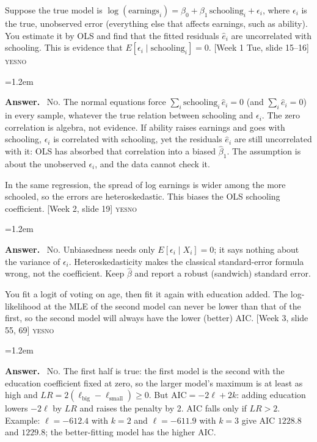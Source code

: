 \documentclass[11pt]{article}
\newcommand{\E}{E}
\newenvironment{answer}{\par\smallskip
  \begin{list}{}{\leftmargin=1.2em\rightmargin=0pt}\item[]\color{dukeblue}%
  \textbf{Answer.}\ }{\end{list}\smallskip}
\newcommand{\yn}{\nolinebreak\hspace*{1em plus 1fill}\mbox{\textsc{yes}\quad\textsc{no}}}
\newcommand{\slideref}[2]{{\footnotesize\color{gray}[Week #1, slide #2]}}
\begin{document}
\begin{enumerate}[leftmargin=*,itemsep=6pt]
\item Suppose the true model is $\log(\text{earnings}_i) = \beta_0 + \beta_1\,
      \text{schooling}_i + \epsilon_i$, where $\epsilon_i$ is the true, unobserved error
      (everything else that affects earnings, such as ability). You estimate it by OLS and
      find that the fitted residuals $\hat e_i$ are uncorrelated with schooling. This is
      evidence that $\E[\epsilon_i \mid \text{schooling}_i] = 0$.
      \slideref{1 Tue}{15--16} \yn
\begin{answer}
\textsc{No}. The normal equations force $\sum_i \text{schooling}_i\,\hat e_i = 0$ (and
$\sum_i \hat e_i = 0$) in every sample, whatever the true relation between schooling and
$\epsilon_i$. The zero correlation is algebra, not evidence. If ability raises earnings and
goes with schooling, $\epsilon_i$ is correlated with schooling, yet the residuals $\hat e_i$
are still uncorrelated with it: OLS has absorbed that correlation into a biased $\hat\beta_1$.
The assumption is about the unobserved $\epsilon_i$, and the data cannot check it.
\end{answer}

\item In the same regression, the spread of log earnings is wider among the more schooled,
      so the errors are heteroskedastic. This biases the OLS schooling coefficient.
      \slideref{2}{19} \yn
\begin{answer}
\textsc{No}. Unbiasedness needs only $\E[\epsilon_i \mid X_i] = 0$; it says nothing about
the variance of $\epsilon_i$. Heteroskedasticity makes the classical standard-error formula
wrong, not the coefficient. Keep $\hat\beta$ and report a robust (sandwich) standard error.
\end{answer}

\item You fit a logit of voting on age, then fit it again with education added. The
      log-likelihood at the MLE of the second model can never be lower than that of the
      first, so the second model will always have the lower (better) AIC.
      \slideref{3}{55, 69} \yn
\begin{answer}
\textsc{No}. The first half is true: the first model is the second with the education
coefficient fixed at zero, so the larger model's maximum is at least as high and
$LR = 2(\ell_{\text{big}} - \ell_{\text{small}}) \ge 0$. But $\text{AIC} = -2\ell + 2k$:
adding education lowers $-2\ell$ by $LR$ and raises the penalty by 2. AIC falls only if
$LR > 2$. Example: $\ell = -612.4$ with $k = 2$ and $\ell = -611.9$ with $k = 3$ give
AIC $1228.8$ and $1229.8$; the better-fitting model has the higher AIC.
\end{answer}


\end{enumerate}
\end{document}
